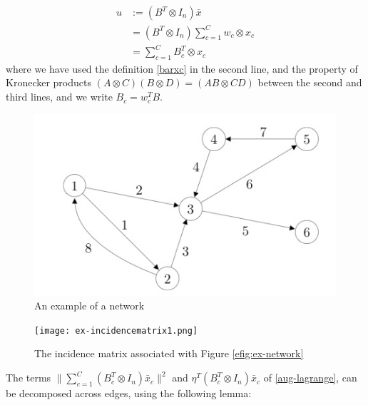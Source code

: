 \begin{defn}
\begin{align*}
u &:= \left(B^T \otimes I_n\right)\bar{x} \\
& = \left(B^T \otimes I_n\right)\sum_{c=1}^C w_c \otimes x_c \\
& = \sum	_{c=1}^C B_c^T\otimes x_c
\end{align*}
where we have used the definition \eqref{barxc} in the second line, and the property of Kronecker products \((A\otimes C)(B \otimes D) = (AB \otimes CD)\) between the second and third lines, and we write \(B_c = w_c^TB\).
\end{defn}

\begin{figure}[h]
\centering
\includegraphics[height = 5 cm]{network-ex-incidence-mat.jpg}
\caption{An example of a network}
\label{efig:ex-network}
\end{figure}

\begin{figure}[h]
\centering
\texttt{[image: ex-incidencematrix1.png]}
\caption{The incidence matrix associated with Figure \eqref{efig:ex-network}}
\label{fig:incidence-matrix}
\end{figure}

The terms \(\|\sum_{c=1}^C\left(B_c^T \otimes I_n\right)\bar{x}_c\|^2\) and \( \eta^T\left(B_c^T \otimes I_n\right)\bar{x}_c \) of \eqref{aug-lagrange}, can be decomposed across edges, using the following lemma:

